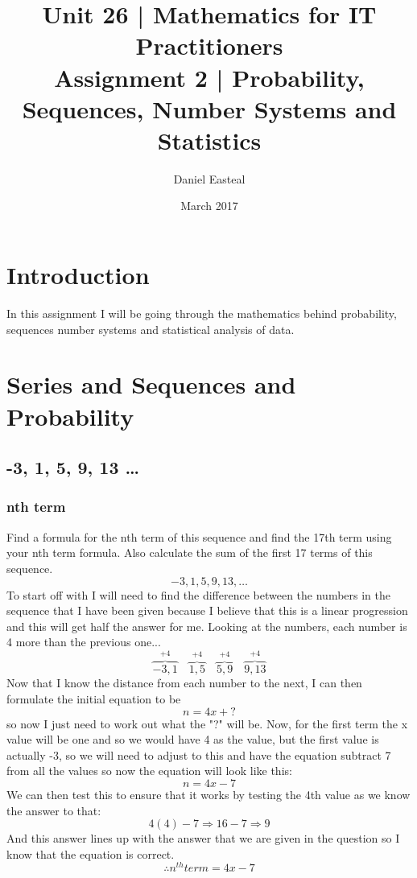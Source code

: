 \documentclass{article}
\begin{document}
\title{Unit 26 | Mathematics for IT Practitioners \\ \vspace{1.5cm} Assignment 2 | Probability, Sequences, Number Systems and Statistics}
\author{Daniel Easteal}
\date{March 2017}
\maketitle
\newpage
\tableofcontents
\newpage
\section{Introduction}
In this assignment I will be going through the mathematics behind probability, sequences number systems and statistical analysis of data. 
\section{Series and Sequences and Probability}
\subsection{-3, 1, 5, 9, 13 \dots}
\subsubsection{nth term}
Find a formula for the nth term of this sequence and find the 17th term using your nth term formula. Also calculate the sum of the first 17 terms of this sequence.
\[
	-3, 1, 5, 9, 13, \dots
\]
To start off with I will need to find the difference between the numbers in the sequence that I have been given because I believe that this is a linear progression and this will get half the answer for me. Looking at the numbers, each number is 4 more than the previous one...
\[
	\overbrace{-3, 1}^{+4}	\quad	\overbrace{1, 5}^{+4}	\quad	\overbrace{5, 9}^{+4}	\quad	\overbrace{9, 13}^{+4}
\]
Now that I know the distance from each number to the next, I can then formulate the initial equation to be $$ n=4x+?$$ so now I just need to work out what the "?" will be. Now, for the first term the x value will be one and so we would have 4 as the value, but the first value is actually -3, so we will need to adjust to this and have the equation subtract 7 from all the values so now the equation will look like this:
\[
	n=4x-7
\]
We can then test this to ensure that it works by testing the 4th value as we know the answer to that:
\[
	4(4)-7	\Rightarrow 16-7	\Rightarrow 9
\]
And this answer lines up with the answer that we are given in the question so I know that the equation is correct.  
\[
	\therefore n^{th} term = 4x-7
\]
\end{document}

